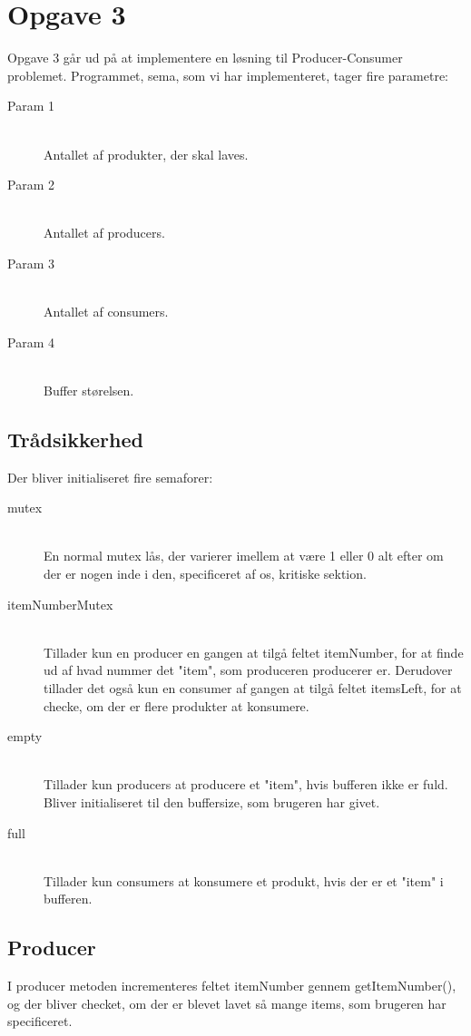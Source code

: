 \section{Opgave 3}
Opgave 3 går ud på at implementere en løsning til Producer-Consumer problemet. Programmet, sema, som vi har implementeret, tager fire parametre:
\begin{description}
\item[Param 1]  \hfill \\ Antallet af produkter, der skal laves.
\item[Param 2]  \hfill \\ Antallet af producers.
\item[Param 3]  \hfill \\ Antallet af consumers.
\item[Param 4]  \hfill \\ Buffer størelsen.
\end{description}

\subsection{Trådsikkerhed}
Der bliver initialiseret fire semaforer:
\begin{description}
\item[mutex]  \hfill \\ En normal mutex lås, der varierer imellem at være 1 eller 0 alt efter om der er nogen inde i den, specificeret af os, kritiske sektion.
\item[itemNumberMutex]  \hfill \\ Tillader kun en producer en gangen at tilgå feltet itemNumber, for at finde ud af hvad nummer det "item", som produceren producerer er. Derudover tillader det også kun en consumer af gangen at tilgå feltet itemsLeft, for at checke, om der er flere produkter at konsumere.
\item[empty]  \hfill \\ Tillader kun producers at producere et "item", hvis bufferen ikke er fuld. Bliver initialiseret til den buffersize, som brugeren har givet.
\item[full]  \hfill \\ Tillader kun consumers at konsumere et produkt, hvis der er et "item" i bufferen.
\end{description}

\subsection{Producer}
I producer metoden incrementeres feltet itemNumber gennem getItemNumber(), og der bliver checket, om der er blevet lavet så mange items, som brugeren har specificeret.

